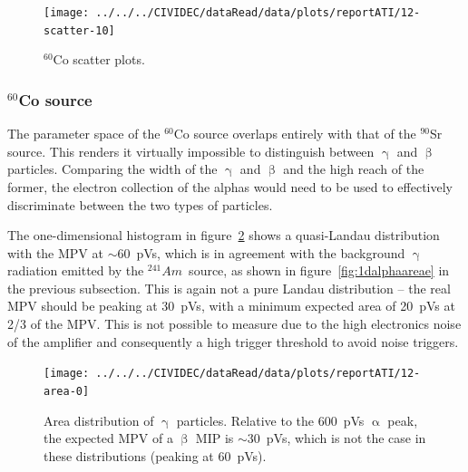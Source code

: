  
\clearpage
\begin{figure}[]
\centering
\texttt{[image: ../../../CIVIDEC/dataRead/data/plots/reportATI/12-scatter-10]}
\caption{$^{60}$Co scatter plots.}
\label{fig:scatterco}
\end{figure}

\clearpage
\subsubsection{$^{60}$Co source}
\label{sec:gammasrc}
The parameter space of the $^{60}$Co source overlaps entirely with that of the $^{90}$Sr source. This renders it virtually impossible to distinguish between $\upgamma$ and $\upbeta$ particles. Comparing the width of the $\upgamma$ and $\upbeta$ and the high reach of the former, the electron collection of the alphas would need to be used to effectively discriminate between the two types of particles. 

The one-dimensional histogram in figure~\ref{fig:1dcoarea} shows a quasi-Landau distribution with the MPV at $\sim$60~pVs, which is in agreement with the background $\upgamma$ radiation emitted by the $^{241}Am$~source, as shown in figure~\ref{fig:1dalphaareae} in the previous subsection. This is again not a pure Landau distribution -- the real MPV should be peaking at 30~pVs, with a minimum expected area of 20~pVs at 2/3 of the MPV. This is not possible to measure due to the high electronics noise of the amplifier and consequently a high trigger threshold to avoid noise triggers.

\begin{figure}
\centering
\texttt{[image: ../../../CIVIDEC/dataRead/data/plots/reportATI/12-area-0]} 
\caption{Area distribution of $\upgamma$ particles. Relative to the 600~pVs $\upalpha$ peak, the expected MPV of a $\upbeta$ MIP is $\sim$30~pVs, which is not the case in these distributions (peaking at 60~pVs). }
\label{fig:1dcoarea}
\end{figure}


%



